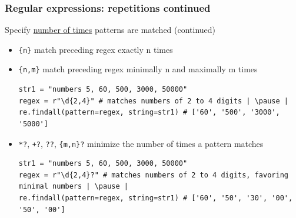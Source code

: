\documentclass[xcolor=table]{beamer}
\begin{document}
\begin{frame}[fragile]
    \frametitle{Regular expressions: repetitions continued}
    Specify \href{https://docs.python.org/3.7/library/re.html#regular-expression-syntax}{number of times} patterns are matched (continued)
    \begin{itemize} \pause
        \item\texttt{\{n\}} match preceding regex exactly n times \pause
        \item\texttt{\{n,m\}} match preceding regex minimally n and maximally m times \pause
\begin{lstlisting}[style=python,belowskip=-1.5 \baselineskip]
str1 = "numbers 5, 60, 500, 3000, 50000"
regex = r"\d{2,4}" # matches numbers of 2 to 4 digits | \pause |  
re.findall(pattern=regex, string=str1) # ['60', '500', '3000', '5000']
\end{lstlisting} \pause
        \item\texttt{*?}, \texttt{+?}, \texttt{??}, \texttt{\{m,n\}?} minimize the number of times a pattern matches \pause
\begin{lstlisting}[style=python,belowskip=-1.5 \baselineskip]
str1 = "numbers 5, 60, 500, 3000, 50000"
regex = r"\d{2,4}?" # matches numbers of 2 to 4 digits, favoring minimal numbers | \pause |  
re.findall(pattern=regex, string=str1) # ['60', '50', '30', '00', '50', '00']
\end{lstlisting} \pause
    \end{itemize}
\end{frame}

\end{document}
